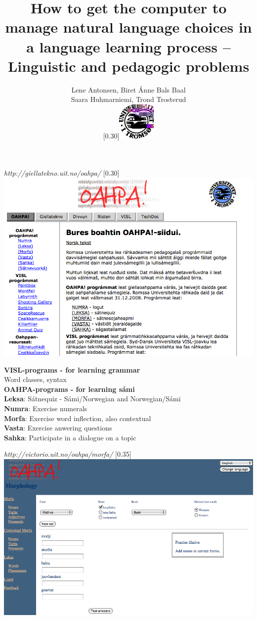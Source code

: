 \documentclass[landscape,norsk,11pt]{seminar}
\title{How to get the computer to manage natural language choices in a language learning process -- Linguistic and pedagogic problems}
\author{Lene Antonsen, Biret Ánne Bals Baal\\
Saara Huhmarniemi, Trond Trosterud \\
 \scalebox{0.30}[0.30]{\includegraphics{img/logoWeb070sh.jpg}}}
\begin{document}
\begin{slide}

\maketitle


\newslide
\textit{http://giellatekno.uit.no/oahpa/}
\scalebox{0.30}[0.30]{\includegraphics{img/gtoahpa.png}} 


\newslide
\textbf{VISL-programs - for learning grammar}\\
\newline
Word classes, syntax\\


\newslide
\textbf{OAHPA-programs - for learning sámi}\\
\newline
\textbf{Leksa}: Sátnequiz - Sámi/Norwegian and Norwegian/Sámi\\
\textbf{Numra}: Exercise numerals\\
\textbf{Morfa}: Exercise word inflection, also contextual \\
\textbf{Vasta}: Exercise anwering questions\\
\textbf{Sahka}: Participate in a dialogue on a topic

\newslide
\textit{http://victorio.uit.no/oahpa/morfa/}
\scalebox{0.35}[0.35]{\includegraphics{img/oahpa.png}} 


\end{slide}
\end{document}
